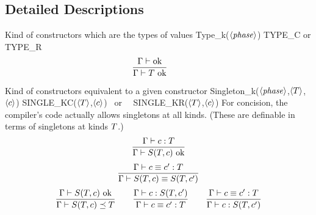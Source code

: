 \documentclass[12pt,twoside,fleqn]{article}
\begin{document}
\irule
  {\qquad
   }
  {}


\subsection{Detailed Descriptions}

  {Kind of constructors which are the types of values}
  {\ktype}
  {Type\_k($\langle{\mathit{phase}}\rangle$)}
  {TYPE\_C \mbox{or} TYPE\_R}
  {}
  {\[\frac
      {{\Gamma}\vdash\mbox{ok}}
      {\Gamma\vdash T\mbox{\ ok}}\qquad
   \]}

  {Kind of constructors equivalent to a given constructor}
  {\ksingleton{\ktype}{\constructor}}
  {Singleton\_k($\langle{\mathit{phase}}\rangle$,$\langle{T}\rangle$,$\langle{c}\rangle$)}
  {SINGLE\_KC($\langle{T}\rangle$,$\langle{c}\rangle$) \mbox{\ or \ }
   SINGLE\_KR($\langle{T}\rangle$,$\langle{c}\rangle$)}
  {For concision, the compiler's code actually allows singletons at
   all kinds.  (These are definable in terms of singletons at kinds
   $T$.)}
  {\[
     \frac
       {\Gamma\vdash c : T}
       {\Gamma\vdash S(T,c)\mbox{\ ok}}
   \]
   \[
   \frac
    {\Gamma\vdash c \equiv c' : T}
    {\Gamma\vdash S(T,c) \equiv S(T,c')}
   \]
   \[
   \frac
    {\Gamma\vdash S(T,c)\mbox{\ ok}}
    {\mbox{$\Gamma\vdash S(T,c) \preceq T$}}
   \qquad
   \frac
    {\Gamma\vdash c : S(T,c')}
    {\Gamma\vdash c \equiv c' : T}
   \qquad
   \frac
    {\Gamma\vdash c \equiv c' : T}
    {\Gamma\vdash c : S(T,c')}
   \]}
\end{document}
